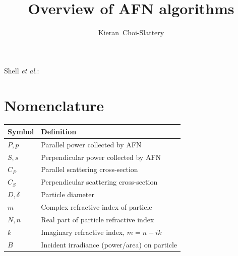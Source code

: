 \documentclass[journal]{IEEEtran}
\begin{document}
\title{Overview of AFN algorithms}
\author{Kieran~Choi-Slattery}
%
{Shell \MakeLowercase{\textit{et al.}}: 
}

\maketitle
\newcommand{\erf}{\mathrm{erf}}
\newcommand{\Cp}{C_{\scriptscriptstyle{P}}}
\newcommand{\Cs}{C_{\scriptscriptstyle{S}}}
\newcommand{\sigmap}{\sigma_{\scriptscriptstyle{P}}}
\newcommand{\sigmas}{\sigma_{\scriptscriptstyle{S}}}
\section{Nomenclature}
\begin{tabular}{l l}
    Symbol & Definition \\
    \hline
    $P, p$ & Parallel power collected by AFN\\
    $S, s$ & Perpendicular power collected by AFN\\
    $C_{\scriptstyle{P}}$ & Parallel scattering cross-section\\
    $C_{\scriptstyle{S}}$ & Perpendicular scattering cross-section\\
    $D, \delta$ & Particle diameter\\
    $m$ & Complex refractive index of particle\\
    $N, n$ & Real part of particle refractive index\\
    $k$ & Imaginary refractive index, $m=n-ik$\\
    $B$ & Incident irradiance (power/area) on particle\\
\end{tabular}
\end{document}
